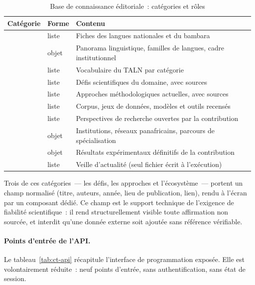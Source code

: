 \begin{table}[H]
	\centering
	\caption{Base de connaissance éditoriale~: catégories et rôles}
	\label{tab:ct-contenu}
	\begin{tabularx}{\textwidth}{@{} L{3.4cm} L{1.9cm} X @{}}
		\toprule
		\textbf{Catégorie} & \textbf{Forme} & \textbf{Contenu} \\
		\midrule
		          & liste  & Fiches des langues nationales et du bambara \\
		 & objet  & Panorama linguistique, familles de langues, cadre institutionnel \\
		          & liste  & Vocabulaire du TALN par catégorie \\
		         & liste  & Défis scientifiques du domaine, avec sources \\
		         & liste  & Approches méthodologiques actuelles, avec sources \\
		          & liste  & Corpus, jeux de données, modèles et outils recensés \\
		       & liste  & Perspectives de recherche ouvertes par la contribution \\
		         & objet  & Institutions, réseaux panafricains, parcours de spécialisation \\
		            & objet  & Résultats expérimentaux définitifs de la contribution \\
		               & liste  & Veille d'actualité (seul fichier écrit à l'exécution) \\
		\bottomrule
	\end{tabularx}
\end{table}

Trois de ces catégories~--- les défis, les approches et l'écosystème~--- portent un
champ  normalisé (titre, auteurs, année, lieu de publication, lien),
rendu à l'écran par un composant dédié. Ce champ est le support technique de
l'exigence de fiabilité scientifique~: il rend structurellement visible toute
affirmation non sourcée, et interdit qu'une donnée externe soit ajoutée sans
référence vérifiable.

\paragraph{Points d'entrée de l'API.}
Le tableau~\ref{tab:ct-api} récapitule l'interface de programmation exposée. Elle est
volontairement réduite~: neuf points d'entrée, sans authentification, sans état de
session.

